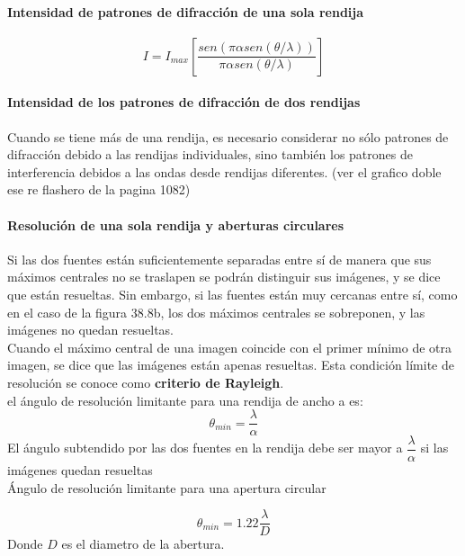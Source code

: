 \documentclass[10pt]{article}
\begin{document}
\paragraph{Intensidad de patrones de difracción de una sola rendija}
\begin{equation*}
	I = I_{max} \left[ \dfrac{sen(\pi \alpha sen(\theta / \lambda))}{\pi \alpha sen(\theta / \lambda )} \right]
\end{equation*}

\paragraph{Intensidad de los patrones de difracción
de dos rendijas}
Cuando se tiene más de una rendija, es necesario considerar no sólo patrones de difracción debido a las rendijas individuales, sino también los patrones de interferencia debidos a las ondas desde rendijas diferentes. (ver el grafico doble ese re flashero de la pagina 1082)

\paragraph{Resolución de una sola rendija y aberturas circulares}
Si las dos fuentes están suficientemente separadas entre sí de manera que sus máximos centrales no se traslapen se podrán distinguir sus imágenes, y se dice que están resueltas. Sin embargo, si las fuentes están muy cercanas entre sí, como en el caso de la figura 38.8b, los dos máximos centrales se sobreponen, y las imágenes no quedan resueltas.\\
\linebreak
Cuando el máximo central de una imagen coincide con el primer mínimo de otra imagen, se dice que las imágenes están apenas resueltas. Esta condición límite de resolución se conoce como \textbf{criterio de Rayleigh}.\\
\linebreak
el ángulo de resolución limitante para una rendija de ancho a es:
\begin{equation*}
	\theta_{min} = \dfrac{\lambda}{\alpha}
\end{equation*}
El ángulo subtendido por las dos fuentes en la rendija debe ser mayor a $\dfrac{\lambda}{\alpha}$ si las imágenes quedan resueltas\\ \linebreak
Ángulo de resolución limitante para una apertura circular

\begin{equation*}
	\theta_{min} = 1.22 \dfrac{\lambda}{D}
\end{equation*}
Donde $D$ es el diametro de la abertura.
\end{document}
